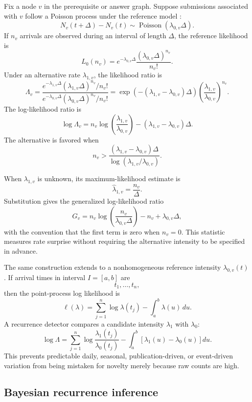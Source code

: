 \documentclass[11pt]{article}
\theoremstyle{definition}
\begin{document}
Fix a node \(v\) in the prerequisite or answer graph. Suppose submissions associated with \(v\) follow a Poisson process under the reference model \cite{daley2003}:
\[
N_v(t+\Delta)-N_v(t)
\sim
\operatorname{Poisson}(\lambda_{0,v}\Delta).
\]
If \(n_v\) arrivals are observed during an interval of length \(\Delta\), the reference likelihood is
\[
L_0(n_v)
=
e^{-\lambda_{0,v}\Delta}
\frac{(\lambda_{0,v}\Delta)^{n_v}}{n_v!}.
\]
Under an alternative rate \(\lambda_{1,v}\), the likelihood ratio is
\[
\Lambda_v
=
\frac{
e^{-\lambda_{1,v}\Delta}
(\lambda_{1,v}\Delta)^{n_v}/n_v!
}{
e^{-\lambda_{0,v}\Delta}
(\lambda_{0,v}\Delta)^{n_v}/n_v!
}
=
\exp\!\left(
-(\lambda_{1,v}-\lambda_{0,v})\Delta
\right)
\left(
\frac{\lambda_{1,v}}{\lambda_{0,v}}
\right)^{n_v}.
\]
The log-likelihood ratio is
\[
\log\Lambda_v
=
n_v
\log\!\left(
\frac{\lambda_{1,v}}{\lambda_{0,v}}
\right)
-
(\lambda_{1,v}-\lambda_{0,v})\Delta.
\]
The alternative is favored when
\[
n_v
>
\frac{
(\lambda_{1,v}-\lambda_{0,v})\Delta
}{
\log(\lambda_{1,v}/\lambda_{0,v})
}.
\]

When \(\lambda_{1,v}\) is unknown, its maximum-likelihood estimate is
\[
\widehat{\lambda}_{1,v}
=
\frac{n_v}{\Delta}.
\]
Substitution gives the generalized log-likelihood ratio
\[
G_v
=
n_v
\log\!\left(
\frac{n_v}{\lambda_{0,v}\Delta}
\right)
-
n_v
+
\lambda_{0,v}\Delta,
\]
with the convention that the first term is zero when \(n_v=0\). This statistic measures rate surprise without requiring the alternative intensity to be specified in advance.

The same construction extends to a nonhomogeneous reference intensity \(\lambda_{0,v}(t)\). If arrival times in interval \(I=[a,b]\) are
\[
t_1,\ldots,t_n,
\]
then the point-process log likelihood is
\[
\ell(\lambda)
=
\sum_{j=1}^{n}\log\lambda(t_j)
-
\int_a^b\lambda(u)\,du.
\]
A recurrence detector compares a candidate intensity \(\lambda_1\) with \(\lambda_0\):
\[
\log\Lambda
=
\sum_{j=1}^{n}
\log
\frac{\lambda_1(t_j)}{\lambda_0(t_j)}
-
\int_a^b
\left[
\lambda_1(u)-\lambda_0(u)
\right]du.
\]
This prevents predictable daily, seasonal, publication-driven, or event-driven variation from being mistaken for novelty merely because raw counts are high.

\subsection{Bayesian recurrence inference}
\end{document}
